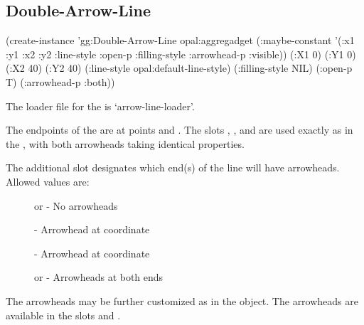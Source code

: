 \begin{group}
\subsection{Double-Arrow-Line}
\label{double-arrow-line}
\begin{programexample}
(create-instance 'gg:Double-Arrow-Line opal:aggregadget
   (:maybe-constant '(:x1 :y1 :x2 :y2 :line-style :open-p :filling-style
		      :arrowhead-p :visible))
   (:X1 0) (:Y1 0)
   (:X2 40) (:Y2 40)
   (:line-style opal:default-line-style)
   (:filling-style NIL)
   (:open-p T)
   (:arrowhead-p :both))
\end{programexample}
\end{group}

The loader file for the  is `arrow-line-loader'.

The endpoints of the  are at points
 and .  The slots ,
, and  are used exactly as in the
, with both arrowheads taking identical properties.

\vspace{1 line}
\begin{group}
The additional slot  designates which
end(s) of the line will have arrowheads.  Allowed values are:

\begin{description}
\item[]  or  - No arrowheads

\item[]  - Arrowhead at coordinate 

\item[]  - Arrowhead at coordinate 

\item[]  or  - Arrowheads at both ends
\end{description}

The arrowheads may be further customized as in the 
object.  The arrowheads are available in the slots 
and .
\end{group}

